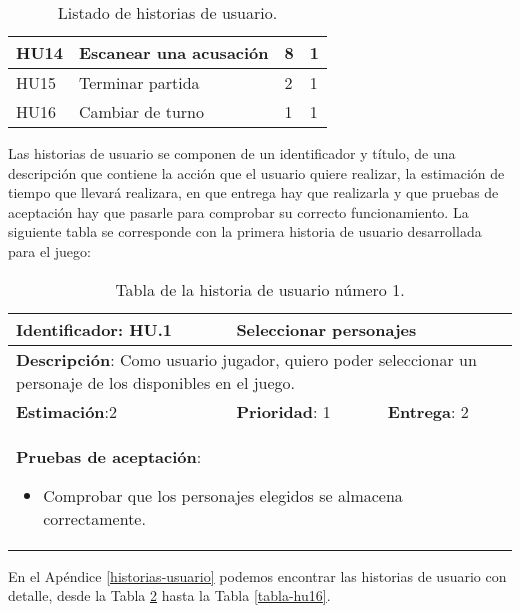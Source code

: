 \begin{table}[h]
\begin{center}
\begin{tabular}{|p{1cm}|p{7.5cm}|p{1.9cm}|p{1.6cm}|}
      \hline
      HU14
      & Escanear una acusación
      & 8
      & 1\\

      \hline
      HU15
      & Terminar partida
      & 2
      & 1\\

      \hline
      HU16
      & Cambiar de turno
      & 1
      & 1\\

      \hline

    \end{tabular}

    \caption{Listado de historias de usuario.}
    \label{tabla-lista-historias-usuario}

  \end{center}
\end{table}

\newpage

Las historias de usuario se componen de un identificador y título, de una descripción que contiene la acción que el usuario quiere realizar, la estimación de tiempo que llevará realizara, en que entrega hay que realizarla y que pruebas de aceptación hay que pasarle para comprobar su correcto funcionamiento. La siguiente tabla se corresponde con la primera historia de usuario desarrollada para el juego:

\begin{table}[h]
  \begin{center}
    \begin{tabular}{|p{4cm}|p{4cm}|p{4cm}|}

    \hline
    \textbf{Identificador}: HU.1
    & \multicolumn{2}{p{8cm}|}{Seleccionar personajes}\\

    \hline
    \multicolumn{3}{|p{12cm}|}{\textbf{Descripción}: Como usuario jugador, quiero poder seleccionar un personaje de los disponibles en el juego.}\\

    \hline
    \textbf{Estimación}:2
    & \textbf{Prioridad}: 1
    & \textbf{Entrega}: 2\\

    \hline
    \multicolumn{3}{|p{12cm}|}{\textbf{Pruebas de aceptación}:
      \begin{itemize}
        \item Comprobar que los personajes elegidos se almacena correctamente.
      \end{itemize}
    }\\

    \hline

    \end{tabular}

    \caption{Tabla de la historia de usuario número 1.}
    \label{tabla-hu1}

  \end{center}
\end{table}

En el Apéndice \ref{historias-usuario} podemos encontrar las historias de usuario con detalle, desde la Tabla \ref{tabla-hu1} hasta la Tabla \ref{tabla-hu16}.
